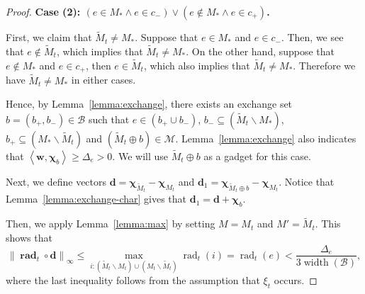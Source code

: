 \documentclass{article}
\newcommand{\M}{\mathcal M}
\newcommand{\B}{\mathcal B}
\newcommand{\del}{\backslash}
\DeclareMathOperator{\rank}{width}
\DeclareMathOperator{\rad}{rad}
\newcommand{\inn}[1]{\left\langle #1 \right\rangle}
\newcommand{\nor}[1]{\left\|#1\right\|}
\renewcommand{\vec}[1]{\boldsymbol{#1}}
\renewcommand{\odot}{\circ}
\begin{document}
\begin{proof}
\textbf{Case (2): $(e \in M_* \wedge e\in c_-) \vee (e \not \in M_* \wedge e\in c_+)$.}

First, we claim that $\tilde M_t \not= M_*$.
Suppose that $e\in M_*$ and $e\in c_-$.
Then, we see that $e\not\in \tilde M_t$, which implies that $\tilde M_t\not=M_*$.
On the other hand, suppose that $e\not \in M_*$ and $e\in c_+$, then $e\in \tilde M_t$, which also implies that $\tilde M_t\not= M_*$.
Therefore we have $\tilde M_t\not=M_*$ in either cases.


Hence, by Lemma~\ref{lemma:exchange}, there exists an exchange set $b=(b_+,b_-)\in \B$ such that 
$e \in (b_+ \cup b_-)$, $b_-\subseteq  (\tilde M_t \del M_*)$, $b_+ \subseteq (M_* \del \tilde M_t)$ and
$(\tilde M_t \oplus b) \in \M$.
Lemma~\ref{lemma:exchange} also indicates that $\inn{\vec w, \vec \chi_b} \ge \Delta_e > 0$.
We will use $\tilde M_t \oplus b$ as a gadget for this case.


Next, we define vectors $\vec d = \vec \chi_{\tilde M_t} - \vec \chi_{M_t}$ and $\vec d_1 = \vec\chi_{\tilde M_t\oplus b}-\vec\chi_{M_t}$.
Notice that Lemma~\ref{lemma:exchange-char} gives that $\vec d_1= \vec d+\vec \chi_b$.

Then, we apply Lemma~\ref{lemma:max} by setting $M = M_t$ and $M' = \tilde M_t$. 
This shows that 
\begin{equation}
\nor{\vec \rad_t\odot \vec d}_\infty \le \max_{i: (\tilde M_t \del M_t)\cup (M_t\del \tilde M_t)} \rad_t(i) = \rad_t(e) < \frac{\Delta_e}{3\rank(\B)},
\label{eq:u-c-2-0}
\end{equation}
where the last inequality follows from the assumption that $\xi_t$ occurs.


\end{proof}
\end{document}
